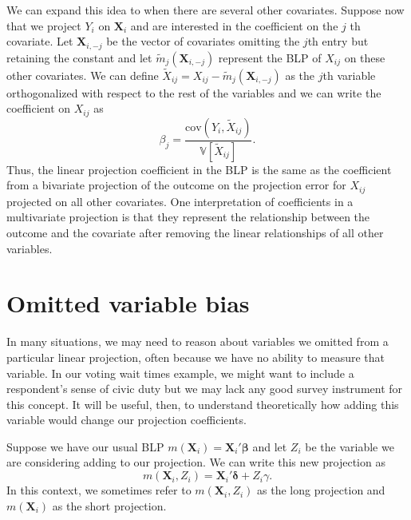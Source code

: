 \documentclass[
  13pt,
  letterpaper,
  DIV=11,
  numbers=noendperiod]{scrreprt}
\newcommand{\bs}{\bm}
\newcommand{\mb}{\bm}
\newcommand{\V}{\mathbb{V}}
\newcommand{\cov}{\text{cov}}
\newcommand{\X}{\mb{X}}
\newcommand{\bfbeta}{\mb{\beta}}
\theoremstyle{plain}
\theoremstyle{plain}
\theoremstyle{definition}
\theoremstyle{definition}
\theoremstyle{remark}
\begin{document}
We can expand this idea to when there are several other covariates.
Suppose now that we project \(Y_i\) on \(\X_i\) and are interested in
the coefficient on the \(j\) th covariate. Let \(\X_{i,-j}\) be the
vector of covariates omitting the \(j\)th entry but retaining the
constant and let \(\widetilde{m}_j(\X_{i,-j})\) represent the BLP of
\(X_{ij}\) on these other covariates. We can define
\(\widetilde{X}_{ij} = X_{ij} - \widetilde{m}_{j}(\X_{i,-j})\) as the
\(j\)th variable orthogonalized with respect to the rest of the
variables and we can write the coefficient on \(X_{ij}\) as \[ 
\beta_j = \frac{\cov(Y_i, \widetilde{X}_{ij})}{\V[\widetilde{X}_{ij}]}.
\] Thus, the linear projection coefficient in the BLP is the same as the
coefficient from a bivariate projection of the outcome on the projection
error for \(X_{ij}\) projected on all other covariates. One
interpretation of coefficients in a multivariate projection is that they
represent the relationship between the outcome and the covariate after
removing the linear relationships of all other variables.

\section{Omitted variable bias}\label{sec-ovb}

In many situations, we may need to reason about variables we omitted
from a particular linear projection, often because we have no ability to
measure that variable. In our voting wait times example, we might want
to include a respondent's sense of civic duty but we may lack any good
survey instrument for this concept. It will be useful, then, to
understand theoretically how adding this variable would change our
projection coefficients.

Suppose we have our usual BLP \(m(\X_{i}) = \X_i'\bfbeta\) and let
\(Z_i\) be the variable we are considering adding to our projection. We
can write this new projection as \[ 
m(\X_i, Z_i) = \X_i'\bs{\delta} + Z_i\gamma.
\] In this context, we sometimes refer to \(m(\X_i, Z_i)\) as the long
projection and \(m(\X_i)\) as the short projection.
\end{document}
